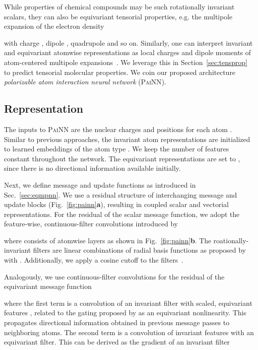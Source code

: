 \documentclass[reprint,
amsmath,amssymb,
 aip,jcp
]{revtex4-2}
\newcommand{\painn}{\textsc{PaiNN}}
\begin{document}
While properties of chemical compounds may be such rotationally invariant scalars, they can also be equivariant tensorial properties, e.g. the multipole expansion of the electron density 

with charge , dipole , quadrupole  and so on.
Similarly, one can interpret invariant and equivariant atomwise representations as local charges and dipole moments of atom-centered multipole expansions~\cite{gastegger2020machine}.
We leverage this in Section~\ref{sec:tensprop} to predict tensorial molecular properties.
We coin our proposed architecture \emph{polarizable atom interaction neural network} (\painn{}).


\subsection{Representation}
The inputs to \painn{} are the nuclear charges  and positions  for each atom .
Similar to previous approaches, the invariant atom representations are initialized to learned embeddings of the atom type . 
We keep the number of features  constant throughout the network.
The equivariant representations are set to , since there is no directional information available initially.

Next, we define message and update functions as introduced in Sec.~\ref{sec:eqmpnn}.
We use a residual structure of interchanging message and update blocks (Fig.~\ref{fig:painn}\textbf{a}), resulting in coupled scalar and vectorial representations.
For the residual of the scalar message function, we adopt the feature-wise, continuous-filter convolutions introduced by \citet{schutt2017schnet}

where  consists of atomwise layers as shown in Fig.~\ref{fig:painn}\textbf{b}.
The roationally-invariant filters  are linear combinations of radial basis functions 
 as proposed by \citet{klicpera2020directional} with .
Additionally, we apply a cosine cutoff to the filters~\cite{behler2011atom}.

Analogously, we use continuous-filter convolutions for the residual of the equivariant message function

where the first term is a convolution of an invariant filter with scaled, equivariant features , related to the gating proposed by \citet{weiler20183d} as an equivariant nonlinearity.
This propagates directional information obtained in previous message passes to neighboring atoms.
The second term is a convolution of invariant features with an equivariant filter.
This can be derived as the gradient of an invariant filter 
\end{document}
